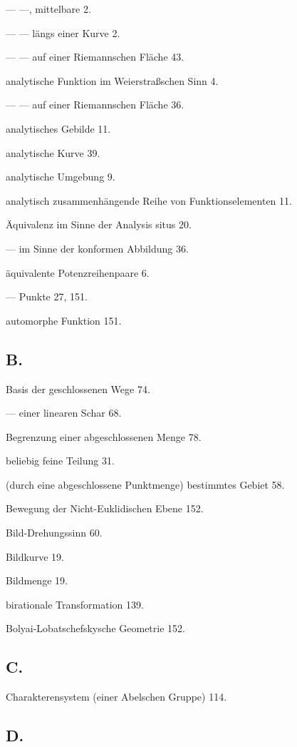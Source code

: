 \documentclass{article}
\begin{document}
--- ---, mittelbare 2.

--- --- längs einer Kurve 2.

--- --- auf einer Riemannschen Fläche 43.

analytische Funktion im Weierstraßschen Sinn 4.

--- --- auf einer Riemannschen Fläche 36.

analytisches Gebilde 11.

analytische Kurve 39.

analytische Umgebung 9.

analytisch zusammenhängende Reihe von Funktionselementen 11.

Äquivalenz im Sinne der Analysis situs 20.

--- im Sinne der konformen Abbildung 36.

äquivalente Potenzreihenpaare 6.

--- Punkte 27, 151.

automorphe Funktion 151.

\subsection*{B.}

Basis der geschlossenen Wege 74.

--- einer linearen Schar 68.

Begrenzung einer abgeschlossenen Menge 78.

beliebig feine Teilung 31.

(durch eine abgeschlossene Punktmenge) bestimmtes Gebiet 58.

Bewegung der Nicht-Euklidischen Ebene 152.

Bild-Drehungssinn 60.

Bildkurve 19.

Bildmenge 19.

birationale Transformation 139.

Bolyai-Lobatschefskysche Geometrie 152.

\subsection*{C.}

Charakterensystem (einer Abelschen Gruppe) 114.

\subsection*{D.}
\end{document}
